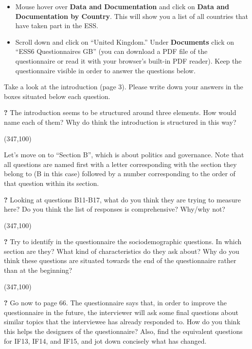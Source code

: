 \documentclass{article}
\newcommand{\forceindent}{\leavevmode{\parindent=2em\indent}}
\begin{document}
\begin{itemize}
	\item Mouse hover over \textbf{Data and Documentation} and click on \textbf{Data and Documentation by Country}. This will show you a list of all countries that have taken part in the ESS.
	\item Scroll down and click on ``United Kingdom.'' Under \textbf{Documents} click on ``ESS6 Questionnaires GB'' (you can download a PDF file of the questionnaire or read it with your browser's built-in PDF reader). Keep the questionnaire visible in order to answer the questions below.
\end{itemize}

Take a look at the introduction (page 3). Please write down your answers in the boxes situated below each question.

\pagebreak

\forceindent \textbf{?} The introduction seems to be structured around three elements. How would name each of them? Why do think the introduction is structured in this way?

\framebox(347,100){}

Let's move on to ``Section B'', which is about politics and governance. Note that all questions are named first with a letter corresponding with the section they belong to (B in this case) followed by a number corresponding to the order of that question within its section.

\forceindent \textbf{?} Looking at questions B11-B17, what do you think they are trying to measure here? Do you think the list of responses is comprehensive? Why/why not?

\framebox(347,100){}

\forceindent \textbf{?} Try to identify in the questionnaire the sociodemographic questions. In which section are they? What kind of characteristics do they ask about? Why do you think these questions are situated towards the end of the questionnaire rather than at the beginning?

\framebox(347,100){}

\pagebreak

\forceindent \textbf{?} Go now to page 66. The questionnaire says that, in order to improve the questionnaire in the future, the interviewer will ask some final questions about similar topics that the interviewee has already responded to. How do you think this helps the designers of the questionnaire? Also, find the equivalent questions for IF13, IF14, and IF15, and jot down concisely what has changed.
\end{document}
